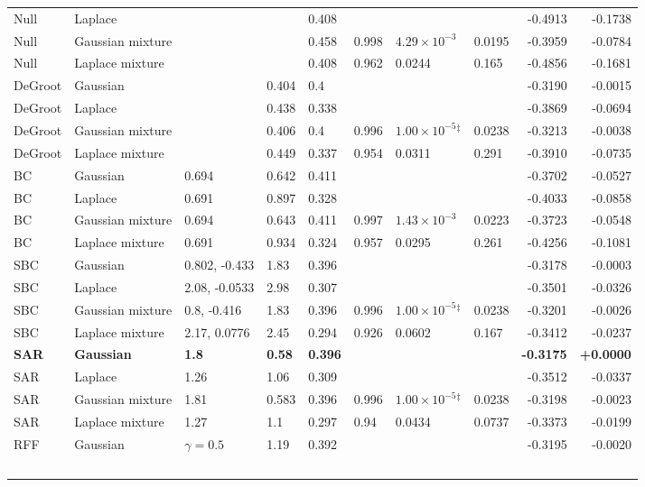 \begin{longtable}{llllllllrr}
Null & Laplace &  &  & 0.408 &  &  &  & -0.4913 & -0.1738 \\
Null & Gaussian mixture &  &  & 0.458 & 0.998 & $4.29\times10^{-3}$ & 0.0195 & -0.3959 & -0.0784 \\
Null & Laplace mixture &  &  & 0.408 & 0.962 & 0.0244 & 0.165 & -0.4856 & -0.1681 \\
DeGroot & Gaussian &  & 0.404 & 0.4 &  &  &  & -0.3190 & -0.0015 \\
DeGroot & Laplace &  & 0.438 & 0.338 &  &  &  & -0.3869 & -0.0694 \\
DeGroot & Gaussian mixture &  & 0.406 & 0.4 & 0.996 & $1.00\times10^{-5}$$^{\ddagger}$ & 0.0238 & -0.3213 & -0.0038 \\
DeGroot & Laplace mixture &  & 0.449 & 0.337 & 0.954 & 0.0311 & 0.291 & -0.3910 & -0.0735 \\
BC & Gaussian & 0.694 & 0.642 & 0.411 &  &  &  & -0.3702 & -0.0527 \\
BC & Laplace & 0.691 & 0.897 & 0.328 &  &  &  & -0.4033 & -0.0858 \\
BC & Gaussian mixture & 0.694 & 0.643 & 0.411 & 0.997 & $1.43\times10^{-3}$ & 0.0223 & -0.3723 & -0.0548 \\
BC & Laplace mixture & 0.691 & 0.934 & 0.324 & 0.957 & 0.0295 & 0.261 & -0.4256 & -0.1081 \\
SBC & Gaussian & 0.802, -0.433 & 1.83 & 0.396 &  &  &  & -0.3178 & -0.0003 \\
SBC & Laplace & 2.08, -0.0533 & 2.98 & 0.307 &  &  &  & -0.3501 & -0.0326 \\
SBC & Gaussian mixture & 0.8, -0.416 & 1.83 & 0.396 & 0.996 & $1.00\times10^{-5}$$^{\ddagger}$ & 0.0238 & -0.3201 & -0.0026 \\
SBC & Laplace mixture & 2.17, 0.0776 & 2.45 & 0.294 & 0.926 & 0.0602 & 0.167 & -0.3412 & -0.0237 \\
\textbf{SAR} & \textbf{Gaussian} & \textbf{1.8} & \textbf{0.58} & \textbf{0.396} &  &  &  & \textbf{-0.3175} & \textbf{+0.0000} \\
SAR & Laplace & 1.26 & 1.06 & 0.309 &  &  &  & -0.3512 & -0.0337 \\
SAR & Gaussian mixture & 1.81 & 0.583 & 0.396 & 0.996 & $1.00\times10^{-5}$$^{\ddagger}$ & 0.0238 & -0.3198 & -0.0023 \\
SAR & Laplace mixture & 1.27 & 1.1 & 0.297 & 0.94 & 0.0434 & 0.0737 & -0.3373 & -0.0199 \\
RFF & Gaussian & $\gamma=0.5$ & 1.19 & 0.392 &  &  &  & -0.3195 & -0.0020 \\
$$
\end{longtable}
